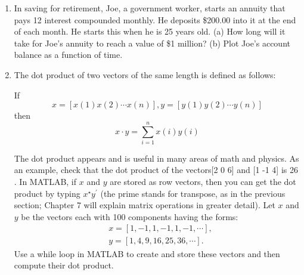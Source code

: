 \documentclass[../main.tex]{subfiles}
\begin{document}
\begin{enumerate}
(b) At exactly what age (to the nearest month) is Louise when the balance exceeds \$100,000? 
Note that throughout these 40 years Louise will have deposited a total of \$200/month x 12 
months/yr. x 40 years = \$96,000. 

\item In saving for retirement, Joe, a government worker, starts an annuity that pays 12%
interest compounded monthly. He deposits \$200.00 into it at the end of each month. He starts 
this when he is 25 years old. (a) How long will it take for Joe's annuity to reach a value of \$1 
million? (b) Plot Joe's account balance as a function of time. 
 
\item The dot product of two vectors of the same length is defined as follows:

If
$$
x=[x(1) x(2) \cdots x(n)], y=[y(1) y(2) \cdots y(n)]
$$
then
$$
x \cdot y=\sum_{i=1}^{n} x(i) y(i)
$$

The dot product appears and is useful in many areas of math and physics. As an example, check that the dot product of the vectors[2 0 6] and [1 -1  4] is 26 . In MATLAB, if $x$ and $y$ are stored as row vectors, then you can get the dot product by typing $x^{\star} y^{\prime}$ (the prime stands for transpose, as in the previous section; Chapter 7 will explain matrix operations in greater detail). Let $x$ and $y$ be the vectors each with 100 components having the forms:
$$
\begin{aligned}
&x=[1,-1,1,-1,1,-1, \cdots], \\
&y=[1,4,9,16,25,36, \cdots] .
\end{aligned}
$$
Use a while loop in MATLAB to create and store these vectors and then compute their dot product.
 
\end{enumerate}

\clearpage
\end{document}
